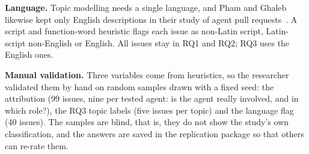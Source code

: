 \textbf{Language.} Topic modelling needs a single language, and Pham and Ghaleb likewise kept only English descriptions in their study of agent pull requests~\cite{pham2026alignment}. A script and function-word heuristic flags each issue as non-Latin script, Latin-script non-English or English. All issues stay in RQ1 and RQ2; RQ3 uses the English ones.

\textbf{Manual validation.} Three variables come from heuristics, so the researcher validated them by hand on random samples drawn with a fixed seed: the attribution (99 issues, nine per tested agent: is the agent really involved, and in which role?), the RQ3 topic labels (five issues per topic) and the language flag (40 issues). The samples are blind, that is, they do not show the study's own classification, and the answers are saved in the replication package so that others can re-rate them.
